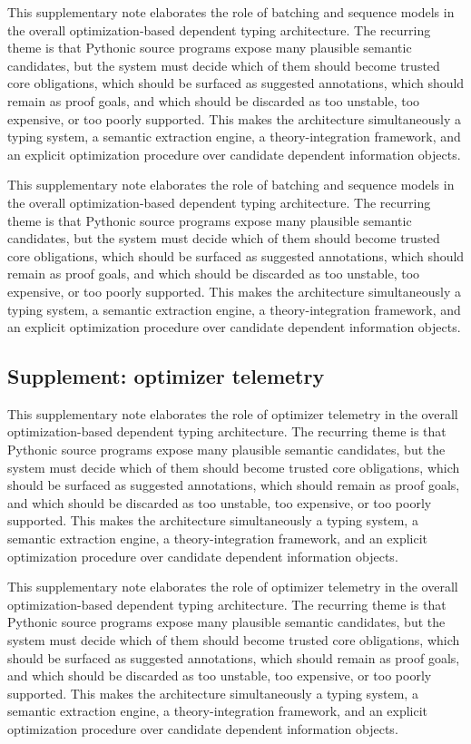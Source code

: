 \documentclass[11pt]{article}
\theoremstyle{definition}
\theoremstyle{plain}
\begin{document}
This supplementary note elaborates the role of batching and sequence models in the overall
optimization-based dependent typing architecture. The recurring theme is that
Pythonic source programs expose many plausible semantic candidates, but the
system must decide which of them should become trusted core obligations, which
should be surfaced as suggested annotations, which should remain as proof
goals, and which should be discarded as too unstable, too expensive, or too
poorly supported. This makes the architecture simultaneously a typing system,
a semantic extraction engine, a theory-integration framework, and an explicit
optimization procedure over candidate dependent information objects.

This supplementary note elaborates the role of batching and sequence models in the overall
optimization-based dependent typing architecture. The recurring theme is that
Pythonic source programs expose many plausible semantic candidates, but the
system must decide which of them should become trusted core obligations, which
should be surfaced as suggested annotations, which should remain as proof
goals, and which should be discarded as too unstable, too expensive, or too
poorly supported. This makes the architecture simultaneously a typing system,
a semantic extraction engine, a theory-integration framework, and an explicit
optimization procedure over candidate dependent information objects.

\subsection{Supplement: optimizer telemetry}
This supplementary note elaborates the role of optimizer telemetry in the overall
optimization-based dependent typing architecture. The recurring theme is that
Pythonic source programs expose many plausible semantic candidates, but the
system must decide which of them should become trusted core obligations, which
should be surfaced as suggested annotations, which should remain as proof
goals, and which should be discarded as too unstable, too expensive, or too
poorly supported. This makes the architecture simultaneously a typing system,
a semantic extraction engine, a theory-integration framework, and an explicit
optimization procedure over candidate dependent information objects.

This supplementary note elaborates the role of optimizer telemetry in the overall
optimization-based dependent typing architecture. The recurring theme is that
Pythonic source programs expose many plausible semantic candidates, but the
system must decide which of them should become trusted core obligations, which
should be surfaced as suggested annotations, which should remain as proof
goals, and which should be discarded as too unstable, too expensive, or too
poorly supported. This makes the architecture simultaneously a typing system,
a semantic extraction engine, a theory-integration framework, and an explicit
optimization procedure over candidate dependent information objects.
\end{document}
